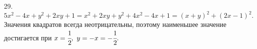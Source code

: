 29. $5x^2-4x+y^2+2xy+1=x^2+2xy+y^2+4x^2-4x+1=(x+y)^2+(2x-1)^2.$ Значения квадратов всегда неотрицательны, поэтому наименьшее значение достигается при $x=\cfrac{1}{2},\ y=-x=-\cfrac{1}{2}.$\\
